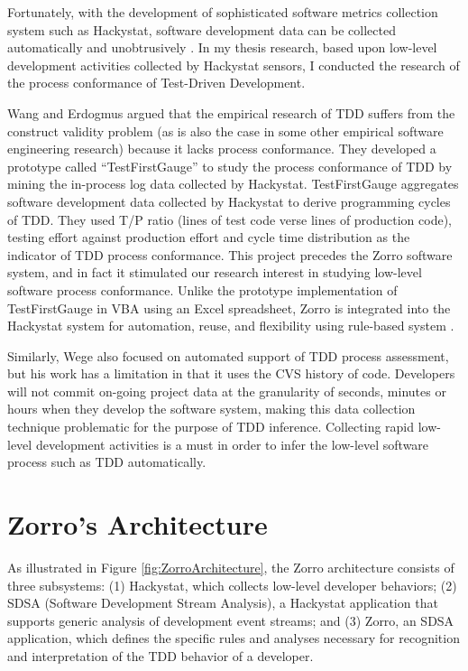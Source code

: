 \documentclass[smallextended]{svjour3}     %
\begin{document}
Fortunately, with the development of sophisticated software 
metrics collection system such as Hackystat, software 
development data can be collected automatically and unobtrusively \cite{Hackystat,csdl2-01-12,csdl2-01-13,csdl2-02-07}. In my thesis 
research, based upon low-level development activities collected by 
Hackystat sensors, I conducted the research of the process conformance 
of Test-Driven Development. 

Wang and Erdogmus \cite{Wang:04} argued that the empirical research 
of TDD suffers from the construct validity problem (as is also the 
case in some other empirical software engineering research) because 
it lacks process conformance. They developed a prototype called 
``TestFirstGauge'' to study the process conformance 
of TDD by mining the in-process log data collected by Hackystat. 
TestFirstGauge aggregates software development data collected
by Hackystat to derive programming cycles of TDD. They used T/P ratio 
(lines of test code verse lines of production code), testing effort 
against production effort and cycle time distribution as the indicator 
of TDD process conformance. This project precedes the Zorro software 
system\cite{csdl2-06-02}, and in fact it stimulated our research interest 
in studying low-level software process conformance. Unlike the
prototype implementation of TestFirstGauge in VBA using an Excel
spreadsheet, Zorro is integrated into the Hackystat system for automation,
reuse, and flexibility using rule-based system \cite{Friedman-Hill:03}.

Similarly, Wege \cite{Wege:04} also focused on automated support of TDD
process assessment, but his work has a limitation in that it uses the CVS
history of code. Developers will not commit on-going project data at the
granularity of seconds, minutes or hours when they develop the software
system, making this data collection technique problematic for the purpose
of TDD inference. Collecting rapid low-level development activities is
a must in order to infer the low-level software process such as TDD
automatically.


\section{Zorro's Architecture}
\label{sec:sdsa}

As illustrated in Figure \ref{fig:ZorroArchitecture}, the Zorro
architecture consists of three subsystems: (1) Hackystat, which collects
low-level developer behaviors; (2) SDSA (Software Development Stream
Analysis), a Hackystat application that supports generic analysis of
development event streams; and (3) Zorro, an SDSA application, which
defines the specific rules and analyses necessary for recognition and
interpretation of the TDD behavior of a developer.
\end{document}
